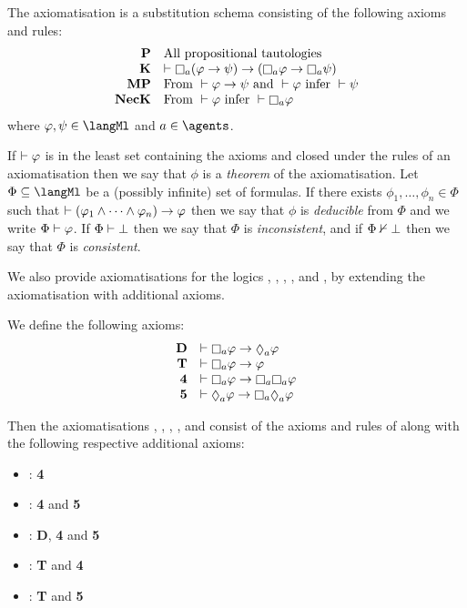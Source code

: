 \begin{definition}
The axiomatisation \axiomK{} is a substitution schema consisting of the following axioms and rules:
$$
\begin{array}{rl}
    {\bf P}     & \text{All propositional tautologies}\\
    {\bf K}     & \proves \necessaryA (\phi \implies \psi) \implies (\necessaryA \phi \implies \necessaryA \psi)\\
    {\bf MP}    & \text{From } \proves \phi \implies \psi \text{ and } \proves \phi \text{ infer } \proves \psi\\
    {\bf NecK}  & \text{From } \proves \phi \text{ infer } \proves \necessaryA \phi
\end{array}
$$
where $\phi, \psi \in \langMl$ and $\agentA \in \agents$.
\end{definition}

If $\vdash \varphi$ is in the least set containing the axioms and closed under the rules of an axiomatisation then we say that $\phi$ is a {\em theorem} of the axiomatisation.
Let $\Phi \subseteq \langMl$ be a (possibly infinite) set of formulas.
If there exists $\phi_1, \dots, \phi_n \in \Phi$ such that $\vdash (\varphi_1 \land \cdots \land \varphi_n) \rightarrow \varphi$ then we say that $\phi$ is {\em deducible} from $\Phi$ and we write $\Phi \vdash \varphi$.
If $\Phi \vdash \bot$ then we say that $\Phi$ is {\em inconsistent}, and if $\Phi \nvdash \bot$ then we say that $\Phi$ is {\em consistent}.

We also provide axiomatisations for the logics \logicKF{}, \logicKFF{}, \logicKD{}, \logicSF{}, and \logicS{}, by extending the axiomatisation \axiomK{} with additional axioms.

\begin{definition}
We define the following axioms:
$$
\begin{array}{rl}
    {\bf D}     & \proves \necessaryA \phi \implies \possibleA \phi\\
    {\bf T}     & \proves \necessaryA \phi \implies \phi\\
    {\bf 4}     & \proves \necessaryA \phi \implies \necessaryA \necessaryA \phi\\
    {\bf 5}     & \proves \possibleA \phi \implies \necessaryA \possibleA \phi
\end{array}
$$

Then the axiomatisations \axiomKF{}, \axiomKFF{}, \axiomKD{}, \axiomSF{}, and \axiomS{} consist of the axioms and rules of \axiomK{} along with the following respective additional axioms:
\begin{itemize}
    \item \axiomKF{}: {\bf 4}
    \item \axiomKFF{}: {\bf 4} and {\bf 5}
    \item \axiomKD{}: {\bf D}, {\bf 4} and {\bf 5}
    \item \axiomSF{}: {\bf T} and {\bf 4}
    \item \axiomS{}: {\bf T} and {\bf 5}
\end{itemize}
\end{definition}

